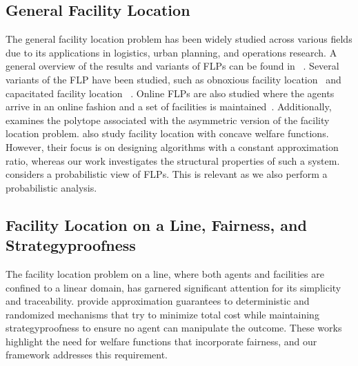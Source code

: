 \subsection{General Facility Location}
The general facility location problem has been widely studied across various fields due to its applications in logistics, urban planning, and operations research. 
A general overview of the results and variants of FLPs can be found in ~\cite{farahani2009facility,melo2009facility, chan2021mechanism}. Several variants of the FLP have been studied, such as obnoxious facility location~\cite{tamir1991obnoxious} and capacitated facility location ~\cite{wu2006capacitated}. Online FLPs are also studied where the agents arrive in an online fashion and a set of facilities is maintained~\cite{meyerson2001online,fotakis2008competitive}.
Additionally, \cite{Leitner2014} examines the polytope associated with the asymmetric version of the facility location problem. 
\cite{fotakis2013strategyproof} also study facility location with concave welfare functions. However, their focus is on designing algorithms with a constant approximation ratio, whereas our work investigates the structural properties of such a system. \cite{snyder2006facility} considers a probabilistic view of FLPs. This is relevant as we also perform a probabilistic analysis.

\subsection{Facility Location on a Line, Fairness, and Strategyproofness}
The facility location problem on a line, where both agents and facilities are confined to a linear domain, has garnered significant attention for its simplicity and traceability. \cite{procaccia2013approximate, Procaccia_Wajc_Zhang_2018} provide approximation guarantees to deterministic and randomized mechanisms that try to minimize total cost while maintaining strategyproofness to ensure no agent can manipulate the outcome. These works highlight the need for welfare functions that incorporate fairness, and our framework addresses this requirement.



